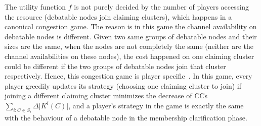 \documentclass[times]{ettauth}
\theoremstyle{mytheoremstyle}
\theoremstyle{mytheoremstyle}
\theoremstyle{mytheoremstyle}
\begin{document}
\begin{itemize}
The utility function $f$ is not purely decided by the number of players accessing the resource (debatable nodes join claiming clusters), which happens in a canonical congestion game.
The reason is in this game the channel availability on debatable nodes is different.
Given two same groups of debatable nodes and their sizes are the same, when the nodes are not completely the same (neither are the channel availabilities on these nodes), the cost happened on one claiming cluster could be different if the two groups of debatable nodes join that cluster respectively.
Hence, this congestion game is player specific~\cite{Ackermann06purenash}.
In this game, every player greedily updates its strategy (choosing one claiming cluster to join) if joining a different claiming cluster minimizes the decrease of CCs $\sum_{i:C\in S_i} \Delta\vert K^i(C) \vert$, and a player's strategy in the game is exactly the same with the behaviour of a debatable node in the membership clarification phase.




\end{itemize}

\end{document}
